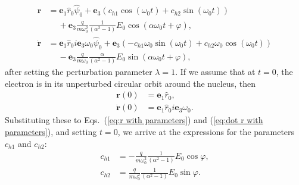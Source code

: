 \documentclass[twocolumn,showpacs,preprintnumbers,amsmath,amssymb]{revtex4}
\begin{document}
\begin{subequations}
\begin{align}
\label{eq:r with parameters}
\mathbf r &= \mathbf e_1\hat r_0\hat\psi_0 +\mathbf e_3(c_{h1}\cos(\omega_0 t) + c_{h2}\sin(\omega_0 t)) \nonumber\\
&\quad \  + \mathbf e_3 \frac{q}{m\omega_0^2}\frac{1}{(\alpha^2 - 1)}E_0\cos(\alpha\omega_0 t + \varphi),\\
\label{eq:dot r with parameters}
\dot{\mathbf r} &= \mathbf e_1\hat r_0 i \mathbf e_3 \omega_0\hat\psi_0 +\mathbf e_3(-c_{h1}\omega_0\sin(\omega_0 t) + c_{h2}\omega_0\cos(\omega_0 t)) \nonumber \\
&\quad \ - \mathbf e_3 \frac{q}{m\omega_0}\frac{\alpha}{(\alpha^2 - 1)}E_0\sin(\alpha\omega_0 t + \varphi),
\end{align}
\end{subequations}
after setting the perturbation parameter $\lambda = 1$.  If we assume that at $t=0$, the electron is in its unperturbed circular orbit around the nucleus, then
\begin{subequations}
\begin{align}
\mathbf r(0) &= \mathbf e_1\hat r_0,\\
\dot{\mathbf r}(0) &= \mathbf e_1\hat r_0 i \mathbf e_3 \omega_0.
\end{align}
\end{subequations}
Substituting these to Eqs.~(\ref{eq:r with parameters}) and (\ref{eq:dot r with parameters}), and setting $t=0$, we arrive at the expressions for the parameters $c_{h1}$ and $c_{h2}$:
\begin{subequations}
\begin{align}
\label{eq:c_h1}
c_{h1} &=  -\frac{q}{m\omega_0^2}\frac{1}{(\alpha^2 - 1)}E_0\cos\varphi,\\
\label{eq:c_h2}
c_{h2} &= \frac{q}{m\omega_0^2}\frac{1}{(\alpha^2 - 1)}E_0\sin\varphi .
\end{align}
\end{subequations}
\end{document}
